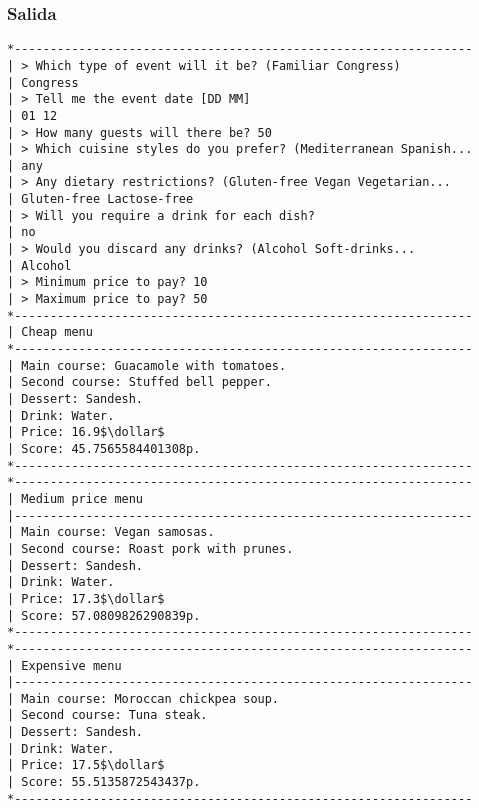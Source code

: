 \documentclass{article}
\newcommand{\dollar}{\mbox{\textdollar}}
\begin{document}
\subsubsection{Salida}
\begin{lstlisting}
*----------------------------------------------------------------
| > Which type of event will it be? (Familiar Congress)
| Congress
| > Tell me the event date [DD MM]
| 01 12
| > How many guests will there be? 50
| > Which cuisine styles do you prefer? (Mediterranean Spanish...
| any
| > Any dietary restrictions? (Gluten-free Vegan Vegetarian...
| Gluten-free Lactose-free
| > Will you require a drink for each dish?
| no
| > Would you discard any drinks? (Alcohol Soft-drinks...
| Alcohol
| > Minimum price to pay? 10
| > Maximum price to pay? 50
*----------------------------------------------------------------
| Cheap menu
*----------------------------------------------------------------
| Main course: Guacamole with tomatoes.
| Second course: Stuffed bell pepper.
| Dessert: Sandesh.
| Drink: Water.
| Price: 16.9$\dollar$
| Score: 45.7565584401308p.
*----------------------------------------------------------------
*----------------------------------------------------------------
| Medium price menu
|----------------------------------------------------------------
| Main course: Vegan samosas.
| Second course: Roast pork with prunes.
| Dessert: Sandesh.
| Drink: Water.
| Price: 17.3$\dollar$
| Score: 57.0809826290839p.
*----------------------------------------------------------------
*----------------------------------------------------------------
| Expensive menu
|----------------------------------------------------------------
| Main course: Moroccan chickpea soup.
| Second course: Tuna steak.
| Dessert: Sandesh.
| Drink: Water.
| Price: 17.5$\dollar$
| Score: 55.5135872543437p.
*----------------------------------------------------------------
\end{lstlisting}
\end{document}
